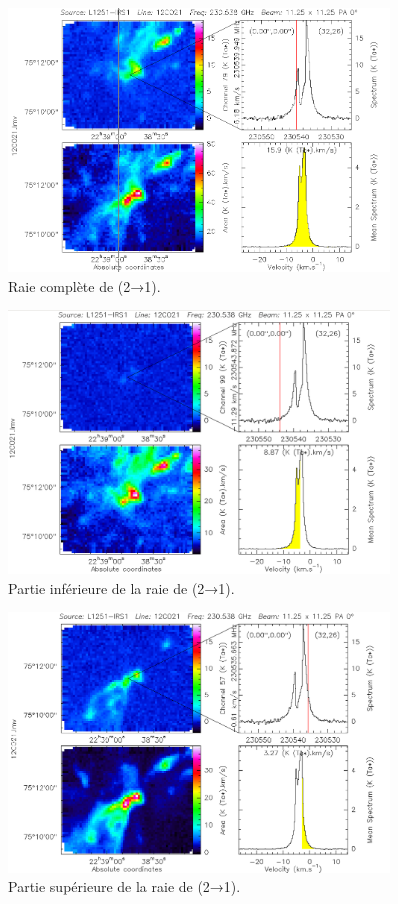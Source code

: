 \documentclass[a4paper,10pt,french]{article}
\begin{document}
\begin{figure}[ht]
    \centering
    \includegraphics[width=0.9\textwidth]{12COfull.png}
    \caption{Raie complète de  (2→1).}
    \label{fig:12COfull}
\end{figure}

\begin{figure}[ht]
    \centering
    \includegraphics[width=0.9\textwidth]{12COblue.png}
    \caption{Partie inférieure de la raie de  (2→1).}
    \label{fig:12COblue}
\end{figure}

\begin{figure}[ht]
    \centering
    \includegraphics[width=0.9\textwidth]{12COred.png}
    \caption{Partie supérieure de la raie de  (2→1).}
    \label{fig:12COred}
\end{figure}
\end{document}
